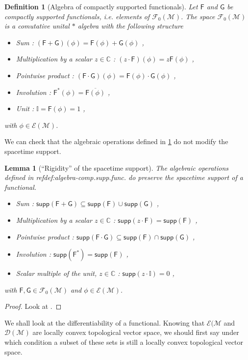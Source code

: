 \documentclass[10pt]{book}
\newcommand{\supp}{\mathsf{supp}}
\newcommand{\Dcal}{\mathcal{D}}
\newcommand{\Ecal}{\mathcal{E}}
\newcommand{\Fcal}{\mathcal{F}}
\newcommand{\Mcal}{\mathcal{M}}
\newcommand{\Cbb}{\mathbb{C}}
\newcommand{\Ibb}{\mathbb{I}}
\newcommand{\Fsf}{\mathsf{F}}
\newcommand{\Gsf}{\mathsf{G}}
\theoremstyle{break}
\newtheorem{lemma}{Lemma}
\newtheorem{definition}{Definition}
\begin{document}
\begin{definition}[Algebra of compactly supported functionals] \label{def:algebra-comp.supp.func.}
Let $\Fsf$ and $\Gsf$ be compactly supported functionals, i.e. elements of $\Fcal_0(\Mcal)$. The space $\Fcal_0(\Mcal)$ is a comutative unital $\ast$ algebra with the following structure
%
\begin{itemize}
\item Sum : $(\Fsf+\Gsf)(\phi) = \Fsf(\phi) + \Gsf(\phi)$ ,
\item Multiplication by a scalar $z\in\Cbb$ : $(z \cdot \Fsf)(\phi) = z \Fsf(\phi)$ ,
\item Pointwise product : $(\Fsf \cdot \Gsf)(\phi) = \Fsf(\phi) \cdot \Gsf(\phi)$ ,
\item Involution : $\Fsf^\ast(\phi) = \overline{\Fsf(\phi)}$ ,
\item Unit : $\Ibb = \Fsf(\phi) = 1$ ,
\end{itemize}
%
with $\phi \in \Ecal(\Mcal)$.
\end{definition}


We can check that the algebraic operations defined in \ref{def:algebra-comp.supp.func.} do not modify the spacetime support.


\begin{lemma}[``Rigidity'' of the spacetime support]
The algebraic operations defined in ref{def:algebra-comp.supp.func.} do preserve the spacetime support of a functional. 
%
\begin{itemize}
\item Sum : $\supp(\Fsf + \Gsf) \subseteq \supp(\Fsf) \cup \supp(\Gsf)$ ,
\item Multiplication by a scalar $z\in\Cbb$ : $\supp(z\cdot\Fsf) = \supp(\Fsf)$ ,
\item Pointwise product : $\supp(\Fsf \cdot \Gsf) \subseteq \supp(\Fsf) \cap \supp(\Gsf)$ ,
\item Involution : $\supp(\Fsf^\ast) = \supp(\Fsf)$ ,
\item Scalar multiple of the unit, $z\in\Cbb$ : $\supp(z\cdot\Ibb) = 0 $ ,
\end{itemize}
%
with $\Fsf, \Gsf \in \Fcal_0(\Mcal)$ and $\phi \in \Ecal(\Mcal)$.
\end{lemma}


\begin{proof}
Look at \cite[lemma 2.3.3]{brunetti_algebraic_2012}.
\end{proof}


We shall look at the differentiability of a functional. Knowing that $\Ecal(\Mcal$ and $\Dcal(\Mcal)$ are locally convex topological vector space, we should first say under which condition a subset of these sets is still a locally convex topological vector space.
\end{document}
